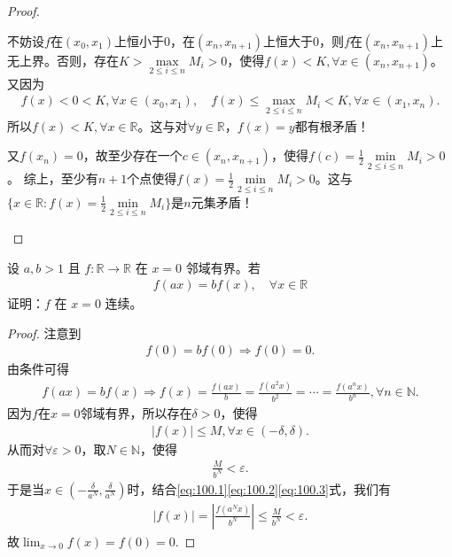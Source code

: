 \documentclass[../../main.tex]{subfiles}
\begin{document}
\begin{proof}
\begin{enumerate}
不妨设\(f\)在\(( x_0,x_1 )\)上恒小于\(0\)，在\(( x_n,x_{n + 1} )\)上恒大于\(0\)，则\(f\)在\(( x_n,x_{n + 1} )\)上无上界。否则，存在\(K>\underset{2\leqslant  i\leqslant  n}{\max}M_i>0\)，使得\(f( x ) <K,\forall x\in ( x_n,x_{n + 1} )\)。又因为
\begin{align*}
f( x ) <0<K,\forall x\in ( x_0,x_1 ),\quad f( x ) \leqslant \underset{2\leqslant  i\leqslant  n}{\max}M_i<K,\forall x\in ( x_1,x_n ).
\end{align*}
所以\(f( x ) <K,\forall x\in \mathbb{R} \)。这与对\(\forall y\in \mathbb{R} \)，\(f( x ) =y\)都有根矛盾！

又\(f( x_n ) =0\)，故至少存在一个\(c\in ( x_n,x_{n + 1} )\)，使得\(f( c ) =\frac{1}{2}\underset{2\leqslant  i\leqslant  n}{\min}M_i>0\)。
综上，至少有\(n + 1\)个点使得\(f( x ) =\frac{1}{2}\underset{2\leqslant  i\leqslant  n}{\min}M_i>0\)。这与\(\{ x\in \mathbb{R} :f( x ) =\frac{1}{2}\underset{2\leqslant  i\leqslant  n}{\min}M_i \}\)是\(n\)元集矛盾！
\end{enumerate}

\end{proof}

\begin{example}
设 \(a,b > 1\) 且 \(f: \mathbb{R} \to \mathbb{R}\) 在 \(x = 0\) 邻域有界。若
\begin{align*}
f(ax) = bf(x),\quad \forall x \in \mathbb{R}
\end{align*}
证明：\(f\) 在 \(x = 0\) 连续。 
\end{example}
\begin{proof}
注意到
\begin{align*}
f(0) = bf(0) \Rightarrow f(0) = 0.
\end{align*}
由条件可得
\begin{align}
f(ax) = bf(x) \Rightarrow f(x) = \frac{f(ax)}{b} = \frac{f(a^2x)}{b^2} = \cdots = \frac{f(a^nx)}{b^n}, \forall n \in \mathbb{N}. \label{eq:100.1}
\end{align}
因为\(f\)在\(x=0\)邻域有界，所以存在\(\delta > 0\)，使得
\begin{align}
|f(x)| \leqslant M, \forall x \in (-\delta, \delta). \label{eq:100.2}
\end{align}
从而对\(\forall \varepsilon > 0\)，取\(N \in \mathbb{N}\)，使得
\begin{align}
\frac{M}{b^N} < \varepsilon. \label{eq:100.3}
\end{align}
于是当\(x \in \left( -\frac{\delta}{a^N}, \frac{\delta}{a^N} \right)\)时，结合\eqref{eq:100.1}\eqref{eq:100.2}\eqref{eq:100.3}式，我们有
\begin{align*}
|f(x)| = \left| \frac{f(a^Nx)}{b^N} \right| \leqslant \frac{M}{b^N} < \varepsilon.
\end{align*}
故\(\lim_{x \to 0} f(x) = f(0) = 0.\)

\end{proof}
\end{document}
